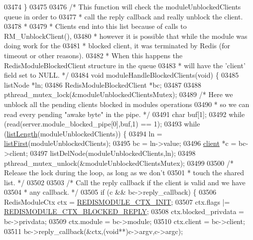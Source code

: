\begin{DoxyCode}
{{{{{{{{{{03474 \}
03475 
03476 \textcolor{comment}{/* This function will check the moduleUnblockedClients queue in order to}
03477 \textcolor{comment}{ * call the reply callback and really unblock the client.}
03478 \textcolor{comment}{ *}
03479 \textcolor{comment}{ * Clients end into this list because of calls to RM\_UnblockClient(),}
03480 \textcolor{comment}{ * however it is possible that while the module was doing work for the}
03481 \textcolor{comment}{ * blocked client, it was terminated by Redis (for timeout or other reasons).}
03482 \textcolor{comment}{ * When this happens the RedisModuleBlockedClient structure in the queue}
03483 \textcolor{comment}{ * will have the 'client' field set to NULL. */}
03484 \textcolor{keywordtype}{void} moduleHandleBlockedClients(\textcolor{keywordtype}{void}) \{
03485     listNode *ln;
03486     RedisModuleBlockedClient *bc;
03487 
03488     pthread\_mutex\_lock(&moduleUnblockedClientsMutex);
03489     \textcolor{comment}{/* Here we unblock all the pending clients blocked in modules operations}
03490 \textcolor{comment}{     * so we can read every pending "awake byte" in the pipe. */}
03491     \textcolor{keywordtype}{char} buf[1];
03492     \textcolor{keywordflow}{while} (read(server.module\_blocked\_pipe[0],buf,1) == 1);
03493     \textcolor{keywordflow}{while} (\hyperlink{adlist_8h_afde0ab079f934670e82119b43120e94b}{listLength}(moduleUnblockedClients)) \{
03494         ln = \hyperlink{adlist_8h_aa8dc514bbe217bb2e87c1c77cfa84690}{listFirst}(moduleUnblockedClients);
03495         bc = ln->value;
03496         \hyperlink{structclient}{client} *c = bc->client;
03497         listDelNode(moduleUnblockedClients,ln);
03498         pthread\_mutex\_unlock(&moduleUnblockedClientsMutex);
03499 
03500         \textcolor{comment}{/* Release the lock during the loop, as long as we don't}
03501 \textcolor{comment}{         * touch the shared list. */}
03502 
03503         \textcolor{comment}{/* Call the reply callback if the client is valid and we have}
03504 \textcolor{comment}{         * any callback. */}
03505         \textcolor{keywordflow}{if} (c && bc->reply\_callback) \{
03506             RedisModuleCtx ctx = \hyperlink{module_8c_a7a80fb134c35b70c7cfe920ea1033bcd}{REDISMODULE\_CTX\_INIT};
03507             ctx.flags |= \hyperlink{module_8c_a06323cb111581e0b8848943a08639a87}{REDISMODULE\_CTX\_BLOCKED\_REPLY};
03508             ctx.blocked\_privdata = bc->privdata;
03509             ctx.module = bc->module;
03510             ctx.client = bc->client;
03511             bc->reply\_callback(&ctx,(\textcolor{keywordtype}{void}**)c->argv,c->argc);
}}}}}}}}}}
\end{DoxyCode}
